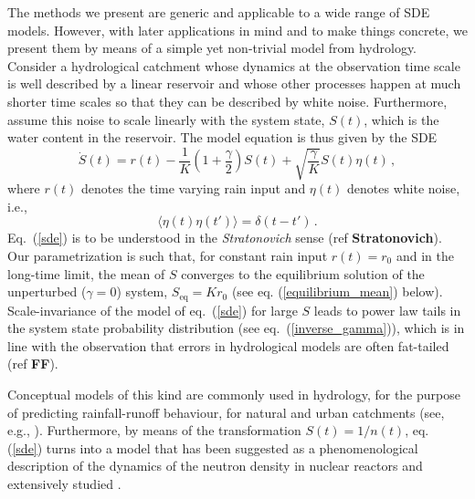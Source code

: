\documentclass[12pt,a4paper,final]{iopart}
\newcommand{\eq}{\mbox{eq}}
\begin{document}
The methods we present are generic and applicable to a wide range of SDE models.
However, with later applications in mind and to make things concrete, we present them by means of a simple yet non-trivial model from hydrology.
Consider a hydrological catchment whose dynamics at the observation time scale is well described by a linear reservoir and whose other processes happen at much shorter time scales so that they can be described by white noise.
Furthermore, assume this noise to scale linearly with the system state, $S(t)$, which is the water content in the reservoir.
The model equation is thus given by the SDE
\begin{equation}\label{sde}
\dot{S}(t) = r(t) - \frac{1}{K}\left(1+\frac{\gamma}{2}\right) S(t)
+
\sqrt{\frac{\gamma}{K}} S(t){\eta}(t)\,,
\end{equation}
where $r(t)$ denotes the time varying rain input and $\eta(t)$ denotes white noise, i.e.,
\begin{equation}\label{whitenoise}
\langle\eta(t)\eta(t')\rangle = \delta(t-t')\,.
\end{equation}
Eq.~(\ref{sde}) is to be understood in the {\em Stratonovich} sense (ref \textbf{Stratonovich}).
Our parametrization is such that, for constant rain input $r(t)=r_0$ and in the long-time limit, the mean of $S$ converges to the equilibrium solution of the unperturbed ($\gamma=0$) system, $S_{\eq}=Kr_0$ (see eq. (\ref{equilibrium_mean}) below).
Scale-invariance of the model of eq.~(\ref{sde}) for large $S$ leads to power law tails in the system state probability distribution (see eq.~(\ref{inverse_gamma})), which is in line with the observation that errors in hydrological models are often fat-tailed (ref \textbf{FF}).

Conceptual models of this kind are commonly used in hydrology, for the purpose of predicting rainfall-runoff behaviour, for natural and urban catchments (see, e.g., \cite{breinholt_2011_SDE}).
Furthermore, by means of the transformation $S(t)=1/n(t)$, eq. (\ref{sde}) turns into a model that has been suggested as a phenomenological description of the dynamics of the neutron density in nuclear reactors and extensively studied \cite{dutre_1977_SDE, fujisaka_1986_intermittency}.
\end{document}
